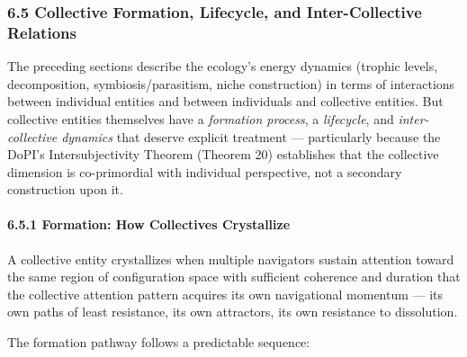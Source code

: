 \subsubsection*{6.5 Collective Formation, Lifecycle, and Inter-Collective Relations}


The preceding sections describe the ecology's energy dynamics (trophic levels, decomposition, symbiosis/parasitism, niche construction) in terms of interactions between individual entities and between individuals and collective entities. But collective entities themselves have a \textit{formation process}, a \textit{lifecycle}, and \textit{inter-collective dynamics} that deserve explicit treatment — particularly because the DoPI's Intersubjectivity Theorem (Theorem 20) establishes that the collective dimension is co-primordial with individual perspective, not a secondary construction upon it.


\paragraph*{6.5.1 Formation: How Collectives Crystallize}


A collective entity crystallizes when multiple navigators sustain attention toward the same region of configuration space with sufficient coherence and duration that the collective attention pattern acquires its own navigational momentum — its own paths of least resistance, its own attractors, its own resistance to dissolution.


The formation pathway follows a predictable sequence:


